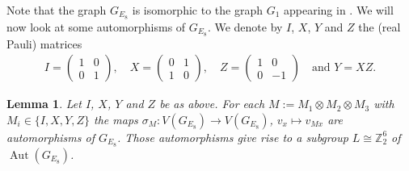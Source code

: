 \documentclass[11pt]{article}
\newtheorem{lemm}[theo]{Lemma}
\theoremstyle{definition}
\numberwithin{equation}{section}
\newcommand{\Z}{\mathbb{Z}}
\DeclareMathOperator{\aut}{Aut}
\begin{document}
Note that the graph $G_{E_8}$ is isomorphic to the graph $G_1$ appearing in \cite[Table 2.2]{MS}. We will now look at some automorphisms of $G_{E_8}$.
We denote by $I$, $X$, $Y$ and $Z$ the (real Pauli) matrices 
\begin{align}\label{Pauli}
I=\begin{pmatrix}1&0\\0&1\end{pmatrix},\quad
X=\begin{pmatrix}0&1\\1&0\end{pmatrix},\quad Z=\begin{pmatrix}1&0\\0&-1\end{pmatrix} \quad\text{and } Y=XZ.
\end{align}

\begin{lemm}\label{Lsubgroup}
Let $I$, $X$, $Y$ and $Z$ be as above. For each $M:=M_1\otimes M_2 \otimes M_3$ with $M_i \in \{I,X,Y,Z\}$ the maps $\sigma_M:V(G_{E_8})\to V(G_{E_8})$, $v_x \mapsto v_{Mx}$ are automorphisms of $G_{E_8}$. Those automorphisms give rise to a  subgroup $L \cong \Z_2^6$ of $\aut(G_{E_8})$.
\end{lemm}
\end{document}
